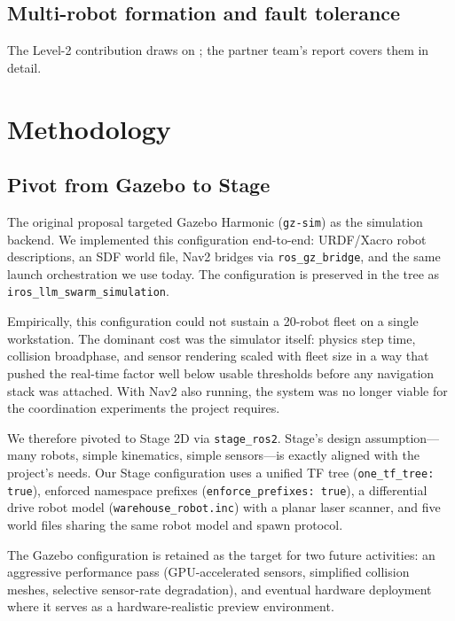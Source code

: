 \documentclass[conference]{IEEEtran}
\begin{document}
\subsection{Multi-robot formation and fault tolerance}

The Level-2 contribution draws on
\cite{santos2020segregative,wang2025apf,jiang2020formation,martinez2023pso,debie2023swarmsurvey,elamvazhuthi2019meanfield,elsayed2024faulttolerant};
the partner team's report covers them in detail.

\section{Methodology}
\label{sec:method}

\subsection{Pivot from Gazebo to Stage}

The original proposal targeted Gazebo Harmonic (\texttt{gz-sim})
as the simulation backend. We implemented this configuration
end-to-end: URDF/Xacro robot descriptions, an SDF world file,
Nav2 bridges via \texttt{ros\_gz\_bridge}, and the same launch
orchestration we use today. The configuration is preserved in
the tree as \texttt{iros\_llm\_swarm\_simulation}.

Empirically, this configuration could not sustain a 20-robot
fleet on a single workstation. The dominant cost was the
simulator itself: physics step time, collision broadphase, and
sensor rendering scaled with fleet size in a way that pushed
the real-time factor well below usable thresholds before any
navigation stack was attached. With Nav2 also running, the
system was no longer viable for the coordination experiments
the project requires.

We therefore pivoted to Stage 2D \cite{vaughan2008stage} via
\texttt{stage\_ros2}. Stage's design assumption---many robots,
simple kinematics, simple sensors---is exactly aligned with the
project's needs. Our Stage configuration uses a unified TF tree
(\texttt{one\_tf\_tree: true}), enforced namespace prefixes
(\texttt{enforce\_prefixes: true}), a differential drive robot
model (\texttt{warehouse\_robot.inc}) with a planar laser
scanner, and five world files sharing the same robot model and
spawn protocol.

The Gazebo configuration is retained as the target for two
future activities: an aggressive performance pass (GPU-accelerated
sensors, simplified collision meshes, selective sensor-rate
degradation), and eventual hardware deployment where it serves as
a hardware-realistic preview environment.
\end{document}
